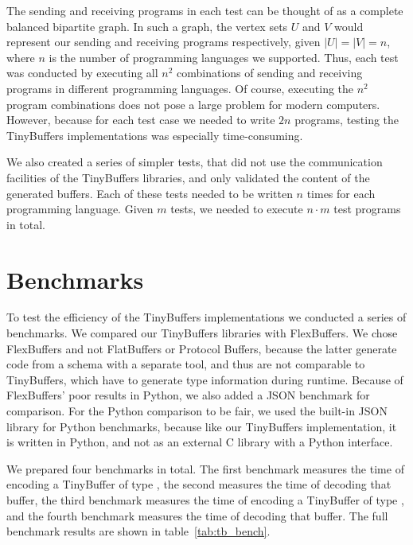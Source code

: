 The sending and receiving programs in each test can be thought of as a complete balanced bipartite graph. In such a graph, the vertex sets $U$ and $V$ would represent our sending and receiving programs respectively, given $|U| = |V| = n$, where $n$ is the number of programming languages we supported. Thus, each test was conducted by executing all $n^2$ combinations of sending and receiving programs in different programming languages. Of course, executing the $n^2$ program combinations does not pose a large problem for modern computers. However, because for each test case we needed to write $2n$ programs, testing the TinyBuffers implementations was especially time-consuming.

We also created a series of simpler tests, that did not use the communication facilities of the TinyBuffers libraries, and only validated the content of the generated buffers. Each of these tests needed to be written $n$ times for each programming language. Given $m$ tests, we needed to execute $n \cdot m$ test programs in total.

\newpage
\section{Benchmarks}

To test the efficiency of the TinyBuffers implementations we conducted a series of benchmarks. We compared our TinyBuffers libraries with FlexBuffers. We chose FlexBuffers and not FlatBuffers or Protocol Buffers, because the latter generate code from a schema with a separate tool, and thus are not comparable to TinyBuffers, which have to generate type information during runtime. Because of FlexBuffers' poor results in Python, we also added a JSON benchmark for comparison. For the Python comparison to be fair, we used the built-in JSON library for Python benchmarks, because like our TinyBuffers implementation, it is written in Python, and not as an external C library with a Python interface.

We prepared four benchmarks in total. The first benchmark measures the time of encoding a TinyBuffer of type , the second measures the time of decoding that buffer, the third benchmark measures the time of encoding a TinyBuffer of type , and the fourth benchmark measures the time of decoding that buffer. The full benchmark results are shown in table~\ref{tab:tb_bench}.

